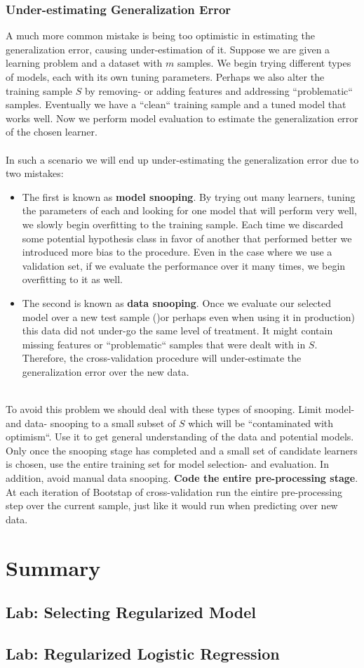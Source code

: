 \subsubsection{Under-estimating Generalization Error}
A much more common mistake is being too optimistic in estimating the generalization error, causing under-estimation of it. Suppose we are given a learning problem and a dataset with $m$ samples. We begin trying different types of models, each with its own tuning parameters. Perhaps we also alter the training sample $S$ by removing- or adding features and addressing ``problematic`` samples. Eventually we have a ``clean`` training sample and a tuned model that works well. Now we perform model evaluation to estimate the generalization error of the chosen learner.
\\~\\
In such a scenario we will end up under-estimating the generalization error due to two mistakes:
\begin{itemize}
	\item The first is known as \textbf{model snooping}. By trying out many learners, tuning the parameters of each and looking for one model that will perform very well, we slowly begin overfitting to the training sample. Each time we discarded some potential hypothesis class in favor of another that performed better we introduced more bias to the procedure. Even in the case where we use a validation set, if we evaluate the performance over it many times, we begin overfitting to it as well.
	\item The second is known as \textbf{data snooping}. Once we evaluate our selected model over a new test sample ()or perhaps even when using it in production) this data did not under-go the same level of treatment. It might contain missing features or ``problematic`` samples that were dealt with in $S$. Therefore, the cross-validation procedure will under-estimate the generalization error over the new data.
\end{itemize}
~\\
To avoid this problem we should deal with these types of snooping. Limit model- and data- snooping to a small subset of $S$ which will be ``contaminated with optimism``. Use it to get general understanding of the data and potential models. Only once the snooping stage has completed and a small set of candidate learners is chosen, use the entire training set for model selection- and evaluation. In addition, avoid manual data snooping. \textbf{Code the entire pre-processing stage}. At each iteration of Bootstap of cross-validation run the eintire pre-processing step over the current sample, just like it would run when predicting over new data.

\section{Summary}
\subsection{Lab: Selecting Regularized Model}
\subsection{Lab: Regularized Logistic Regression}